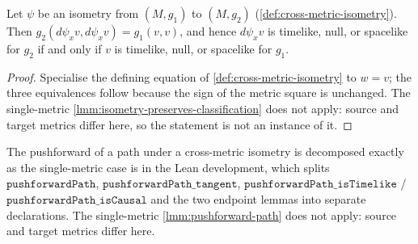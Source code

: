 \begin{lemma}
    \label{lmm:cross-metric-isometry-preserves-classification}
    \leanok
    Let $\psi$ be an isometry from $(M,g_1)$ to $(M,g_2)$ (\ref{def:cross-metric-isometry}). Then $g_2(d\psi_x v, d\psi_x v) = g_1(v,v)$, and hence $d\psi_x v$ is timelike, null, or spacelike for $g_2$ if and only if $v$ is timelike, null, or spacelike for $g_1$.
\end{lemma}
\begin{proof}
    \leanok
    Specialise the defining equation of \ref{def:cross-metric-isometry} to $w = v$; the three equivalences follow because the sign of the metric square is unchanged. The single-metric \ref{lmm:isometry-preserves-classification} does not apply: source and target metrics differ here, so the statement is not an instance of it.
\end{proof}

The pushforward of a path under a cross-metric isometry is decomposed exactly as the single-metric case is in the Lean development, which splits $\mathtt{pushforwardPath}$, $\mathtt{pushforwardPath\_tangent}$, $\mathtt{pushforwardPath\_isTimelike}$ / $\mathtt{pushforwardPath\_isCausal}$ and the two endpoint lemmas into separate declarations. The single-metric \ref{lmm:pushforward-path} does not apply: source and target metrics differ here.

